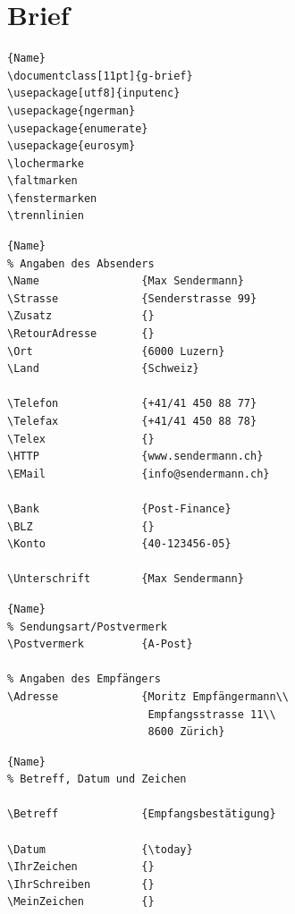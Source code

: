 \section{Brief}

\begin{lstlisting}[caption=Allgemeine Settings,
                   label={lst:simplelist}]{Name}
\documentclass[11pt]{g-brief}
\usepackage[utf8]{inputenc}
\usepackage{ngerman}
\usepackage{enumerate}
\usepackage{eurosym}
\lochermarke
\faltmarken
\fenstermarken
\trennlinien                   
\end{lstlisting}

\begin{lstlisting}[caption=Angaben Absender,
                   label={lst:simplelist}]{Name}
% Angaben des Absenders
\Name                {Max Sendermann}
\Strasse             {Senderstrasse 99}
\Zusatz              {}
\RetourAdresse       {}
\Ort                 {6000 Luzern}
\Land                {Schweiz}

\Telefon             {+41/41 450 88 77}
\Telefax             {+41/41 450 88 78}
\Telex               {}
\HTTP                {www.sendermann.ch}
\EMail               {info@sendermann.ch}

\Bank                {Post-Finance}
\BLZ                 {}
\Konto               {40-123456-05}

\Unterschrift        {Max Sendermann}                  
\end{lstlisting}

\begin{lstlisting}[caption=Postvermerk und Empfaenger,
                   label={lst:simplelist}]{Name}
% Sendungsart/Postvermerk
\Postvermerk         {A-Post}

% Angaben des Empfängers
\Adresse             {Moritz Empfängermann\\
                      Empfangsstrasse 11\\
                      8600 Zürich}                  
\end{lstlisting}

\begin{lstlisting}[caption=Betreff und Datum,
                   label={lst:simplelist}]{Name}
% Betreff, Datum und Zeichen

\Betreff             {Empfangsbestätigung}

\Datum               {\today}
\IhrZeichen          {}
\IhrSchreiben        {}
\MeinZeichen         {}
\end{lstlisting}

